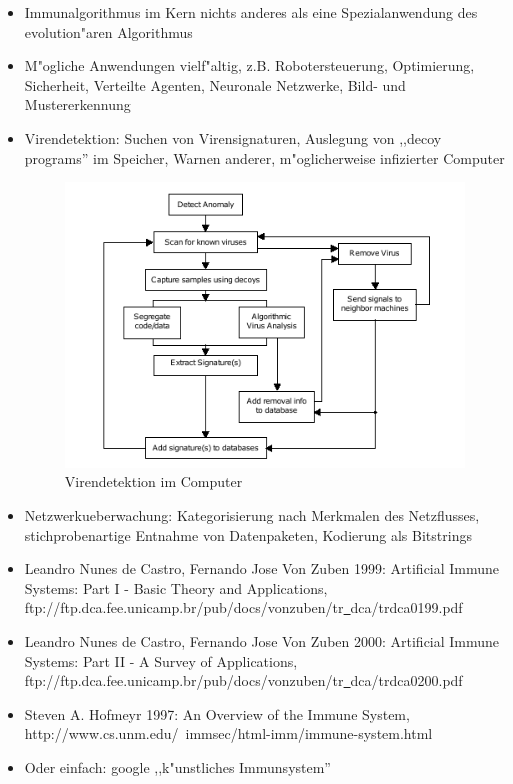 \documentclass[10pt, a4]{seminar}
\begin{document}
\begin{slide}
\begin{itemize}
\item Immunalgorithmus im Kern nichts anderes als eine Spezialanwendung des evolution"aren Algorithmus
\item M"ogliche Anwendungen vielf"altig, z.B. Robotersteuerung, Optimierung, Sicherheit, Verteilte Agenten, Neuronale Netzwerke, Bild- und Mustererkennung
\item Virendetektion: Suchen von Virensignaturen, Auslegung von ,,decoy programs'' im Speicher, Warnen anderer, m"oglicherweise infizierter Computer
\begin{figure}[h]
\includegraphics[scale=0.5]{immunvirus.png}
\caption{Virendetektion im Computer}
\end{figure}
\item Netzwerkueberwachung: Kategorisierung nach Merkmalen des Netzflusses, stichprobenartige Entnahme von Datenpaketen, Kodierung als Bitstrings
\end{itemize}
\vfill
\end{slide}


\begin{slide}
\begin{itemize}
\item Leandro Nunes de Castro, Fernando Jose Von Zuben 1999: Artificial Immune Systems: Part I - Basic Theory and Applications, ftp://ftp.dca.fee.unicamp.br/pub/docs/vonzuben/tr\underline\ dca/trdca0199.pdf
\item Leandro Nunes de Castro, Fernando Jose Von Zuben 2000: Artificial Immune Systems: Part II - A Survey of Applications, ftp://ftp.dca.fee.unicamp.br/pub/docs/vonzuben/tr\underline\ dca/trdca0200.pdf
\item Steven A. Hofmeyr 1997: An Overview of the Immune System, http://www.cs.unm.edu/~immsec/html-imm/immune-system.html
\item Oder einfach: google ,,k"unstliches Immunsystem''
\end{itemize}
\vfill
\end{slide}
\end{document}
